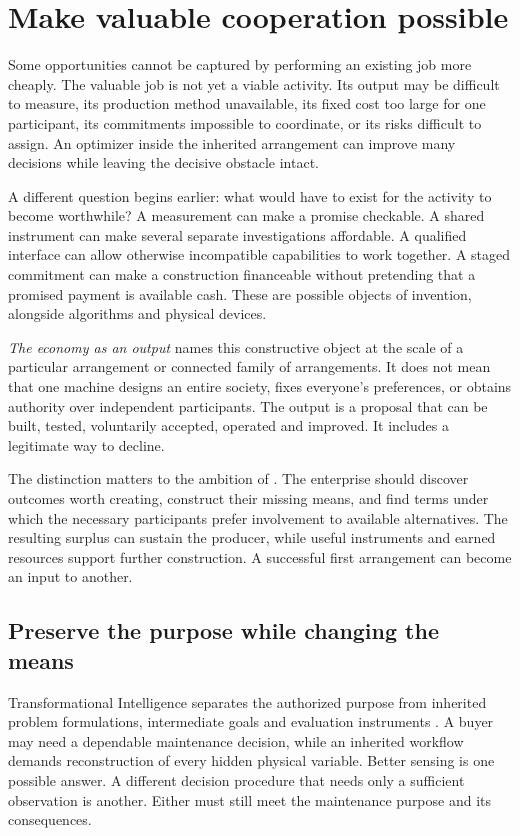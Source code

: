 \section{Make valuable cooperation possible}\label{sec:construction}
Some opportunities cannot be captured by performing an existing job more cheaply. The valuable job is not yet a viable activity. Its output may be difficult to measure, its production method unavailable, its fixed cost too large for one participant, its commitments impossible to coordinate, or its risks difficult to assign. An optimizer inside the inherited arrangement can improve many decisions while leaving the decisive obstacle intact.

A different question begins earlier: what would have to exist for the activity to become worthwhile? A measurement can make a promise checkable. A shared instrument can make several separate investigations affordable. A qualified interface can allow otherwise incompatible capabilities to work together. A staged commitment can make a construction financeable without pretending that a promised payment is available cash. These are possible objects of invention, alongside algorithms and physical devices.

\emph{The economy as an output} names this constructive object at the scale of a particular arrangement or connected family of arrangements. It does not mean that one machine designs an entire society, fixes everyone's preferences, or obtains authority over independent participants. The output is a proposal that can be built, tested, voluntarily accepted, operated and improved. It includes a legitimate way to decline.

The distinction matters to the ambition of \omegaFW. The enterprise should discover outcomes worth creating, construct their missing means, and find terms under which the necessary participants prefer involvement to available alternatives. The resulting surplus can sustain the producer, while useful instruments and earned resources support further construction. A successful first arrangement can become an input to another.

\subsection{Preserve the purpose while changing the means}
Transformational Intelligence separates the authorized purpose from inherited problem formulations, intermediate goals and evaluation instruments \cite{ti,original}. A buyer may need a dependable maintenance decision, while an inherited workflow demands reconstruction of every hidden physical variable. Better sensing is one possible answer. A different decision procedure that needs only a sufficient observation is another. Either must still meet the maintenance purpose and its consequences.

